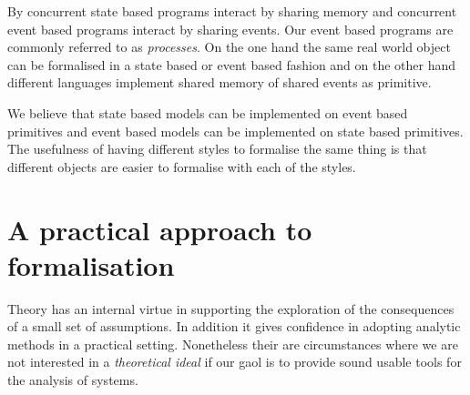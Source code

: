 \documentclass[]{article}
\begin{document}
 

By concurrent state based programs interact by sharing memory and concurrent event based programs interact by sharing events. Our event based programs  are commonly referred to as \emph{processes}. On the one hand the same real world object  can be formalised  in a state based or event based fashion and on the other hand different languages implement shared memory of shared events as primitive.   

We believe that state based models can be implemented on event based primitives and event based models can be implemented on state based primitives.  The usefulness of having different styles to formalise the same thing is that different  objects are easier to formalise with each of the styles.

\section{A practical  approach to formalisation}
Theory has an internal virtue in  supporting the exploration of the consequences of a small set of assumptions. In addition it gives confidence in adopting analytic methods in a practical setting.  Nonetheless their are circumstances where  we are not interested in a \emph{theoretical ideal} if our gaol is to provide sound usable tools for the analysis of systems. 
\end{document}
